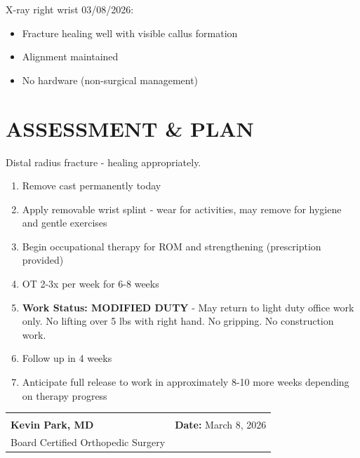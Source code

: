\documentclass[11pt]{article}
\begin{document}
X-ray right wrist 03/08/2026:
\begin{itemize}[nosep]
\item Fracture healing well with visible callus formation
\item Alignment maintained
\item No hardware (non-surgical management)
\end{itemize}

\section*{ASSESSMENT \& PLAN}

Distal radius fracture - healing appropriately.

\begin{enumerate}
\item Remove cast permanently today
\item Apply removable wrist splint - wear for activities, may remove for hygiene and gentle exercises
\item Begin occupational therapy for ROM and strengthening (prescription provided)
\item OT 2-3x per week for 6-8 weeks
\item \textbf{Work Status: MODIFIED DUTY} - May return to light duty office work only. No lifting over 5 lbs with right hand. No gripping. No construction work.
\item Follow up in 4 weeks
\item Anticipate full release to work in approximately 8-10 more weeks depending on therapy progress
\end{enumerate}

\vspace{2em}

\begin{tabular}{@{}p{7cm}p{7cm}@{}}
\hrulefill & \\
\textbf{Kevin Park, MD} & \textbf{Date:} March 8, 2026 \\
Board Certified Orthopedic Surgery & \\
\end{tabular}
\end{document}
